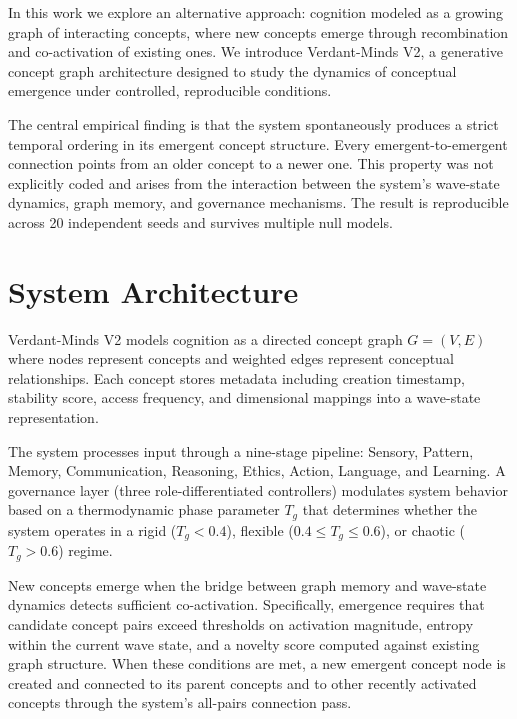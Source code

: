 \documentclass[11pt]{article}
\begin{document}
In this work we explore an alternative approach: cognition modeled as a growing graph of interacting concepts, where new concepts emerge through recombination and co-activation of existing ones. We introduce Verdant-Minds V2, a generative concept graph architecture designed to study the dynamics of conceptual emergence under controlled, reproducible conditions.

The central empirical finding is that the system spontaneously produces a strict temporal ordering in its emergent concept structure. Every emergent-to-emergent connection points from an older concept to a newer one. This property was not explicitly coded and arises from the interaction between the system's wave-state dynamics, graph memory, and governance mechanisms. The result is reproducible across 20 independent seeds and survives multiple null models.

\section{System Architecture}

Verdant-Minds V2 models cognition as a directed concept graph $G = (V, E)$ where nodes represent concepts and weighted edges represent conceptual relationships. Each concept stores metadata including creation timestamp, stability score, access frequency, and dimensional mappings into a wave-state representation.

The system processes input through a nine-stage pipeline: Sensory, Pattern, Memory, Communication, Reasoning, Ethics, Action, Language, and Learning. A governance layer (three role-differentiated controllers) modulates system behavior based on a thermodynamic phase parameter $T_g$ that determines whether the system operates in a rigid ($T_g < 0.4$), flexible ($0.4 \leq T_g \leq 0.6$), or chaotic ($T_g > 0.6$) regime.

New concepts emerge when the bridge between graph memory and wave-state dynamics detects sufficient co-activation. Specifically, emergence requires that candidate concept pairs exceed thresholds on activation magnitude, entropy within the current wave state, and a novelty score computed against existing graph structure. When these conditions are met, a new emergent concept node is created and connected to its parent concepts and to other recently activated concepts through the system's all-pairs connection pass.
\end{document}
